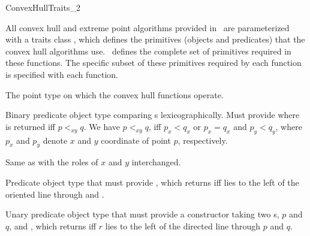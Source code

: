 

\begin{ccRefConcept}{ConvexHullTraits_2}

\ccDefinition
  
All convex hull and extreme point algorithms provided in \cgal\ are
parameterized with a traits class , which defines the
primitives (objects and predicates) that the convex hull algorithms use.
\ccRefName\ defines the complete set of primitives required in these
functions.  The specific subset of these primitives required by each function
is specified with each function.

\ccTypes
\ccAutoIndexingOff
{}

%
       {The point type on which the convex hull functions operate.}

%
       {Binary predicate object type comparing s
        lexicographically.  Must provide 
         where 
        is returned iff $p <_{xy} q$.
        We have $p<_{xy}q$, iff $p_x < q_x$ or $p_x = q_x$ and $p_y < q_y$,
        where $p_x$ and $p_y$ denote $x$ and $y$ coordinate of point $p$,
        respectively.
       }

%
       {Same as  with the roles of $x$ and $y$ interchanged.}

%
       {Predicate object type that must provide
        , which
        returns  iff  lies to the left of the
        oriented line through  and .}

%
       {Unary predicate object type that
        must provide a constructor taking two s, $p$ and
        $q$, and , which returns  iff
        $r$ lies to the left of the directed line through $p$ and $q$.}


\end{ccRefConcept}
